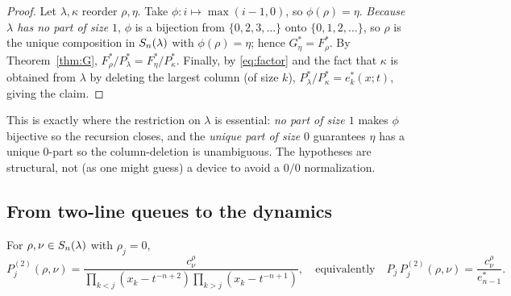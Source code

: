 \begin{proof}
Let $\lambda,\kappa$ reorder $\rho,\eta$. Take $\phi:i\mapsto\max(i-1,0)$, so
$\phi(\rho)=\eta$. \emph{Because $\lambda$ has no part of size $1$}, $\phi$ is a
bijection from $\{0,2,3,\dots\}$ onto $\{0,1,2,\dots\}$, so $\rho$ is the unique
composition in $S_n(\lambda)$ with $\phi(\rho)=\eta$; hence $G^*_\eta=F^*_\rho$. By
Theorem~\ref{thm:G},
$F^*_\rho/P^*_\lambda=F^*_\eta/P^*_\kappa$. Finally, by \eqref{eq:factor} and the
fact that $\kappa$ is obtained from $\lambda$ by deleting the largest column (of
size $k$), $P^*_\lambda/P^*_\kappa=e^*_k(x;t)$, giving the claim.
\end{proof}

This is exactly where the restriction on $\lambda$ is essential: \emph{no part of
size $1$} makes $\phi$ bijective so the recursion closes, and the \emph{unique
part of size $0$} guarantees $\eta$ has a unique $0$-part so the column-deletion
is unambiguous. The hypotheses are structural, not (as one might guess) a device
to avoid a $0/0$ normalization.

\subsection*{From two-line queues to the dynamics}

\begin{qthreeproposition}\label{prop:step2}
For $\rho,\nu\in S_n(\lambda)$ with $\rho_j=0$,
\[
P^{(2)}_j(\rho,\nu)=\frac{c^\rho_\nu}{\prod_{k<j}(x_k-t^{-n+2})\prod_{k>j}(x_k-t^{-n+1})},
\quad\text{equivalently}\quad
P_j\,P^{(2)}_j(\rho,\nu)=\frac{c^\rho_\nu}{e^*_{n-1}} .
\]
\end{qthreeproposition}

